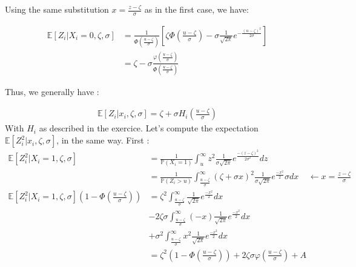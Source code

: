 \documentclass{article}
\begin{document}
\noindent Using the same substitution $x = \frac{z-\zeta}{\sigma}$ as in the first case, we have:

\begin{align*}
\mathbb{E}[Z_i | X_i=0, \zeta, \sigma] &= \frac{1}{\Phi(\frac{u-\zeta}{\sigma})}
                \left [
                \zeta
                 \Phi \left (\frac{u-\zeta}{\sigma}\right ) 
                 -
                \sigma \frac{1}{\sqrt{2\pi}}
                e^{ -\frac{(u-\zeta)^2}{2\sigma}  } 
                \right ] \\
                &= \zeta 
                -\sigma 
                \frac{\varphi \left ( \frac{u-\zeta}{\sigma} \right )}
                { \Phi \left (\frac{u-\zeta}{\sigma}\right )}
    \end{align*}

\noindent Thus, we generally have :

\begin{align*}
    \mathbb{E}[Z_i|x_i, \zeta, \sigma] = \zeta + \sigma H_i\left (\frac{u-\zeta}{\sigma} \right)
\end{align*}
With $H_i$ as described in the exercice. Let's compute the 
expectation $\mathbb{E}[Z^2_i|x_i, \zeta, \sigma]$, in the same way. First : 
\begin{align*}
    \mathbb{E}[Z_i^2 |X_i = 1, \zeta, \sigma] &= \frac{1}{\mathbb{P}(X_i=1)}
                    \int_{u}^{\infty}
                    z^2
                    \frac{1}{\sigma \sqrt{2\pi}} 
                    e^{ \frac{-(z-\zeta)^2}{2 \sigma^2}  } dz \\
                &= \frac{1}{\mathbb{P}(Z_i > u)}
                    \int_{\frac{u-\zeta}{\sigma}}^{\infty} 
                    (\zeta+\sigma x)^2
                    \frac{1}{\sigma \sqrt{2\pi}} 
                    e^{ \frac{-x^2}{2}  } 
                    \sigma dx \ \ \ \ \ \leftarrow x=\frac{z-\zeta}{\sigma} \\
\mathbb{E}[Z_i^2 |X_i = 1, \zeta, \sigma] 
(1- \Phi \left (\frac{u-\zeta}{\sigma}\right ) )
                &= 
                \zeta^2
                \int_{\frac{u-\zeta}{\sigma}}^{\infty} 
                \frac{1}{\sqrt{2\pi}} 
                e^{ \frac{-x^2}{2}  } 
                  dx \\
                &- 2\zeta \sigma
                \int_{\frac{u-\zeta}{\sigma}}^{\infty} 
                (- x)
                \frac{1}{\sqrt{2\pi}} 
                e^{ \frac{-x^2}{2}  } 
                dx \\
                &+ \sigma^2
                \int_{\frac{u-\zeta}{\sigma}}^{\infty} 
                x^2
                \frac{1}{\sqrt{2\pi}} 
                e^{ \frac{-x^2}{2}  } 
                dx \\
                &= 
                \zeta^2
                (1- \Phi \left (\frac{u-\zeta}{\sigma}\right ) )
                + 2 \zeta \sigma \varphi \left (\frac{u-\zeta}{\sigma}\right ) + A
\end{align*}
\end{document}
